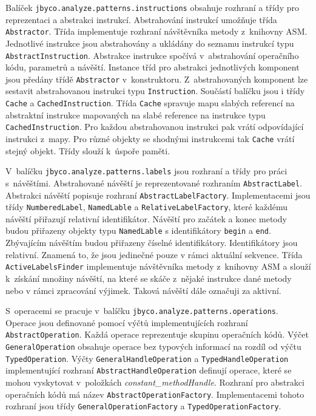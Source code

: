 Balíček \texttt{jbyco.analyze.patterns.instructions} obsahuje rozhraní a třídy pro reprezentaci a abstrakci instrukcí. Abstrahování instrukcí umožňuje třída \texttt{Abstractor}. Třída implementuje rozhraní návštěvníka metody z~knihovny ASM. Jednotlivé instrukce jsou abstrahovány a ukládány do seznamu instrukcí typu \texttt{AbstractInstruction}. Abstrakce instrukce spočívá v~abstrahování operačního kódu, parametrů a návěští. Instance tříd pro abstrakci jednotlivých komponent jsou předány třídě \texttt{Abstractor} v~konstruktoru. Z~abstrahovaných komponent lze sestavit abstrahovanou instrukci typu \texttt{Instruction}. Součástí balíčku jsou i třídy \texttt{Cache} a \texttt{CachedInstruction}. Třída \texttt{Cache} spravuje mapu slabých referencí na abstraktní instrukce mapovaných na slabé reference na instrukce typu \texttt{CachedInstruction}. Pro každou abstrahovanou instrukci pak vrátí odpovídající instrukci z~mapy. Pro různé objekty se shodnými instrukcemi tak \texttt{Cache} vrátí stejný objekt. Třídy slouží k~úspoře paměti.

V~balíčku \texttt{jbyco.analyze.patterns.labels} jsou rozhraní a třídy pro práci s~návěštími. Abstrahované návěští je reprezentované rozhraním \texttt{AbstractLabel}. Abstrakci návěští popisuje rozhraní \texttt{AbstractLabelFactory}. Implementacemi jsou třídy \texttt{NumberedLabel}, \texttt{NamedLable} a \texttt{RelativeLabelFactory}, které každému návěští přiřazují relativní identifikátor. Návěští pro začátek a konec metody budou přiřazeny objekty typu \texttt{NamedLable} s identifikátory \texttt{begin} a \texttt{end}. Zbývajícím návěštím budou přiřazeny číselné identifikátory. Identifikátory jsou relativní. Znamená to, že jsou jedinečné pouze v rámci aktuální sekvence. Třída \texttt{ActiveLabelsFinder} implementuje návštěvníka metody z~knihovny ASM a slouží k~získání množiny návěští, na které se skáče z~nějaké instrukce dané metody nebo v rámci zpracování výjimek. Taková návěští dále označuji za aktivní.

S~operacemi se pracuje v~balíčku \texttt{jbyco.analyze.patterns.operations}. Operace jsou definované pomocí výčtů implementujících rozhraní \texttt{AbstractOperation}. Každá operace reprezentuje skupinu operačních kódů. Výčet \texttt{GeneralOperation} obsahuje operace bez typových informací na rozdíl od výčtu \texttt{TypedOperation}. Výčty \texttt{GeneralHandleOperation} a \texttt{TypedHandleOperation} implementující rozhraní \texttt{AbstractHandleOperation} definují operace, které se mohou vyskytovat v~položkách \textit{constant\_methodHandle}. Rozhraní pro abstrakci operačních kódů má název \texttt{AbstractOperationFactory}. Implementacemi tohoto rozhraní jsou třídy \texttt{GeneralOperationFactory} a \texttt{TypedOperationFactory}. 

